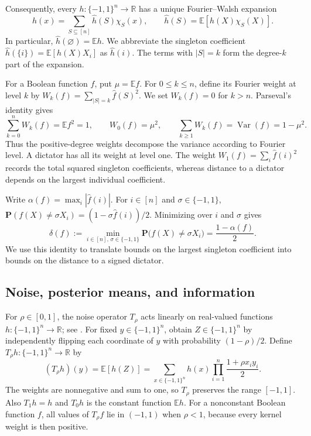 \documentclass[11pt,letterpaper]{amsart}
\newcommand{\E}{\mathbb E}
\newcommand{\R}{\mathbb R}
\newcommand{\PP}{\mathbf P}
\newcommand{\1}{\mathbf 1}
\DeclareMathOperator{\Var}{Var}
\numberwithin{equation}{section}
\begin{document}
Consequently, every $h:\{-1,1\}^n\to\R$ has a unique
Fourier--Walsh expansion
\[
 h(x)=\sum_{S\subseteq[n]}\widehat h(S)\chi_S(x),
 \qquad
 \widehat h(S)=\E[h(X)\chi_S(X)].
\]
In particular, $\widehat h(\varnothing)=\E h$.
We abbreviate the singleton coefficient
$\widehat h(\{i\})=\E[h(X)X_i]$ as $\widehat h(i)$.
The terms with $|S|=k$ form the degree-$k$ part of the expansion.

For a Boolean function $f$, put $\mu=\E f$.
For $0\le k\le n$, define its Fourier weight at level $k$ by
$W_k(f)=\sum_{|S|=k}\widehat f(S)^2$. We set $W_k(f)=0$ for $k>n$.
Parseval's identity gives
\[
 \sum_{k=0}^n W_k(f)=\E f^2=1,
 \qquad W_0(f)=\mu^2,\qquad
 \sum_{k \ge 1} W_k(f)=\Var(f)=1-\mu^2.
\]
Thus the positive-degree weights decompose the variance according
to Fourier level. A dictator has all its weight at level one.
The weight $W_1(f)=\sum_i\widehat f(i)^2$ records the total squared
singleton coefficients, whereas distance to a dictator depends
on the largest individual coefficient.

Write $\alpha(f)=\max_i|\widehat f(i)|$.
For $i\in[n]$ and $\sigma\in\{-1,1\}$,
$\PP(f(X)\ne\sigma X_i)=(1-\sigma\widehat f(i))/2$.
Minimizing over $i$ and $\sigma$ gives
\begin{equation}\label{eq:dictator-distance}
 \delta(f):=\min_{i\in[n],\,\sigma\in\{-1,1\}}
       \PP\bigl(f(X)\ne\sigma X_i\bigr)
 =\frac{1-\alpha(f)}2.
\end{equation}
We use this identity to translate bounds on the largest singleton
coefficient into bounds on the distance to a signed dictator.

\subsection{Noise, posterior means, and information}
\label{sec:noise}

For $\rho\in[0,1]$, the noise operator $T_\rho$ acts linearly on
real-valued functions $h:\{-1,1\}^n\to\R$; see
\cite[Definition~2.46 and Proposition~2.47]{ODonnell2014}.
For fixed $y\in\{-1,1\}^n$, obtain $Z\in\{-1,1\}^n$ by
independently flipping each coordinate of $y$ with probability
$(1-\rho)/2$.
Define $T_\rho h:\{-1,1\}^n\to\R$ by
\[
 (T_\rho h)(y)=\E[h(Z)]
 =\sum_{x\in\{-1,1\}^n}
     h(x)\prod_{i=1}^n\frac{1+\rho x_i y_i}{2}.
\]
The weights are nonnegative and sum to one, so $T_\rho$ preserves
the range $[-1,1]$.
Also $T_1h=h$ and $T_0h$ is the constant function $\E h$.
For a nonconstant Boolean function $f$, all values of $T_\rho f$
lie in $(-1,1)$ when $\rho<1$, because every kernel weight is
then positive.
\end{document}
